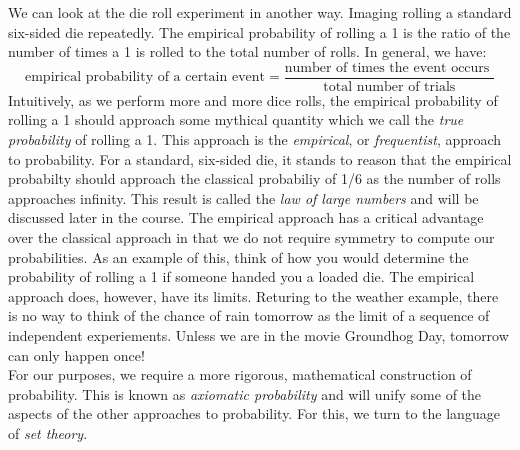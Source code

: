 \documentclass[12pt]{article}
\theoremstyle{definition}
\theoremstyle{remark}
\begin{document}
We can look at the die roll experiment in another way. Imaging rolling a standard six-sided die repeatedly. The empirical probability of rolling a 1 is the ratio of the number of times a 1 is rolled to the total number of rolls. In general, we have:
\[
\text{empirical probability of a certain event} = \frac{ \text{number of times the event occurs }}{\text{total number of trials}}
\]
Intuitively, as we perform more and more dice rolls, the empirical probability of rolling a 1 should approach some mythical quantity which we call the \emph{true probability} of rolling a 1. This approach is the \emph{empirical}, or \emph{frequentist}, approach to probability. For a standard, six-sided die, it stands to reason that the empirical probabilty should approach the classical probabiliy of 1/6 as the number of rolls approaches infinity. This result is called the \emph{law of large numbers} and will be discussed later in the course. The empirical approach has a critical advantage over the classical approach in that we do not require symmetry to compute our probabilities. As an example of this, think of how you would determine the probability of rolling a 1 if someone handed you a loaded die. The empirical approach does, however, have its limits. Returing to the weather example, there is no way to think of the chance of rain tomorrow as the limit of a sequence of independent experiements. Unless we are in the movie Groundhog Day, tomorrow can only happen once!\\

For our purposes, we require a more rigorous, mathematical construction of probability. This is known as \emph{axiomatic probability} and will unify some of the aspects of the other approaches to probability. For this, we turn to the language of \emph{set theory}.
\end{document}
